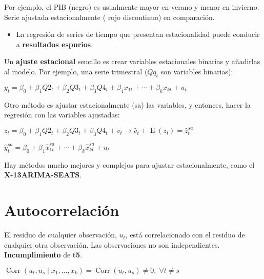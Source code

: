 \documentclass[10pt, a4paper, landscape]{article}
\DeclareMathOperator{\E}{E}
\DeclareMathOperator{\Corr}{Corr}
\begin{document}
\begin{multicols}{3}
\begin{multicols}{2}
\end{multicols}

Por ejemplo, el PIB (negro) es usualmente mayor en verano y menor en invierno. Serie ajustada estacionalmente ({\color{red} rojo discontinuo}) en comparación.

\begin{itemize}[leftmargin=*]
	\item La regresión de series de tiempo que presentan estacionalidad puede conducir a \textbf{resultados espurios}.
\end{itemize}

Un \textbf{ajuste estacional} sencillo es crear variables estacionales binarias y añadirlas al modelo. Por ejemplo, una serie trimestral (\( Q q_{t} \) son variables binarias):

\begin{center}
	\( y_{t} = \beta_{0} + \beta_{1} Q2_{t} + \beta_{2} Q3_{t} + \beta_{3} Q4_{t} + \beta_{4} x_{1t} + \cdots + \beta_{k} x_{kt} + u_{t} \)
\end{center}

Otro método es ajustar estacionalmente (sa) las variables, y entonces, hacer la regresión con las variables ajustadas:

\begin{center}
	\( z_{t} = \beta_{0} + \beta_{1} Q2_{t} + \beta_{2} Q3_{t} + \beta_{3} Q4_{t} + v_{t} \rightarrow \hat{v}_{t} + \E(z_{t}) = \hat{z}_{t}^{sa} \)

	\( \hat{y}_{t}^{sa} = \beta_{0} + \beta_{1} \hat{x}_{1t}^{sa} + \cdots + \beta_{k} \hat{x}_{kt}^{sa} + u_{t} \)
\end{center}

Hay métodos mucho mejores y complejos para ajustar estacionalmente, como el \textbf{X-13ARIMA-SEATS}.

\columnbreak

\section*{Autocorrelación}

El residuo de cualquier observación, \( u_{t} \), está correlacionado con el residuo de cualquier otra observación. Las observaciones no son independientes. \textbf{Incumplimiento} de \textbf{t5}.

\begin{center}
	\( \Corr(u_{t}, u_{s} \mid x_{1}, \ldots, x_{k}) = \Corr(u_{t}, u_{s}) \neq 0, \; \forall t \neq s \)
\end{center}


\end{multicols}
\end{document}
